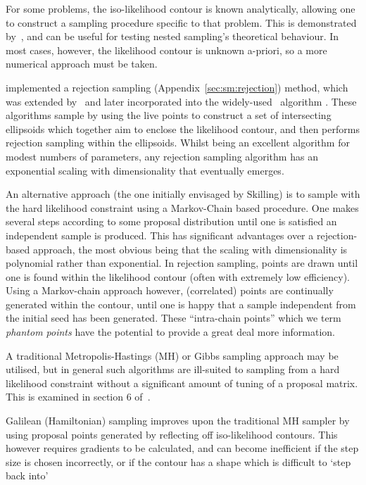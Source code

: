 For some problems, the iso-likelihood contour is known analytically, allowing one to construct a sampling procedure specific to that problem. This is demonstrated by~\cite{Keeton}, and can be useful for testing nested sampling's theoretical behaviour. In most cases, however, the likelihood contour is unknown a-priori, so a more numerical approach must be taken.

\cite{Mukherjee} implemented a rejection sampling (Appendix~\ref{sec:sm:rejection}) method, which was extended by~\cite{Shaw_et_al} and later incorporated into the widely-used~\MultiNest{} algorithm \citep{MultiNest1,MultiNest2,MultiNest3}.
These algorithms sample by using the live points to construct a set of intersecting ellipsoids which together aim to enclose the likelihood contour, and then performs rejection sampling within the ellipsoids.
 Whilst being an excellent algorithm for modest numbers of parameters, any rejection sampling algorithm has an exponential scaling with dimensionality that eventually emerges.

An alternative approach (the one initially envisaged by Skilling) is to sample with the hard likelihood constraint using a Markov-Chain based procedure. One makes several steps according to some proposal distribution until one is satisfied an independent sample is produced. This has significant advantages over a rejection-based approach, the most obvious being that the scaling with dimensionality is polynomial rather than exponential. In rejection sampling, points are drawn until one is found within the likelihood contour (often with extremely low efficiency). Using a Markov-chain approach however, (correlated) points are continually generated within the contour, until one is happy that a sample independent from the initial seed has been generated. These ``intra-chain points'' which we term {\em phantom points\/} have the potential to provide a great deal more information.

A traditional Metropolis-Hastings (MH) or Gibbs sampling approach may be utilised, but in general such algorithms are ill-suited to sampling from a hard likelihood constraint without a significant amount of tuning of a proposal matrix. This is examined in section 6 of~\cite{MultiNest1}.

Galilean (Hamiltonian) sampling \citep{GalileanNestedSampling,Betancourt2011} improves upon the traditional MH sampler by using proposal points generated by reflecting off iso-likelihood contours. This however requires gradients to be calculated, and can become inefficient if the step size is chosen incorrectly, or if the contour has a shape which is difficult to `step back into'

